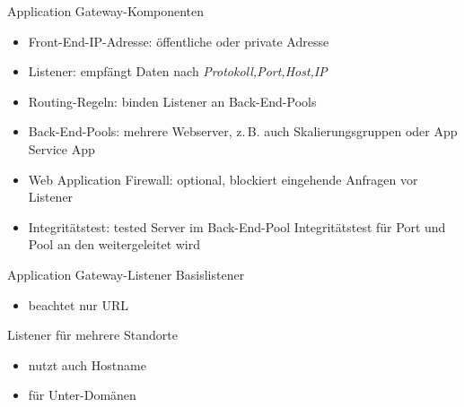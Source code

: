 \begin{flashcard}[Definition]{Application Gateway-Komponenten}
    \begin{itemize}
        \item Front-End-IP-Adresse: öffentliche oder private Adresse
        \item Listener: empfängt Daten nach \emph{Protokoll,Port,Host,IP}
        \item Routing-Regeln: binden Listener an Back-End-Pools
        \item Back-End-Pools: mehrere Webserver, z.\,B. auch Skalierungsgruppen oder App Service App
        \item Web Application Firewall: optional, blockiert eingehende Anfragen vor Listener
        \item Integritätstest: tested Server im Back-End-Pool\newline
            Integritätstest für Port und Pool an den weitergeleitet wird
    \end{itemize}
\end{flashcard}

\begin{flashcard}[Definition]{Application Gateway-Listener}
    Basislistener
    \begin{itemize}
        \item beachtet nur URL
    \end{itemize}
    \vspace{1cm}
    Listener für mehrere Standorte
    \begin{itemize}
        \item nutzt auch Hostname
        \item für Unter-Domänen
    \end{itemize}
\end{flashcard}


